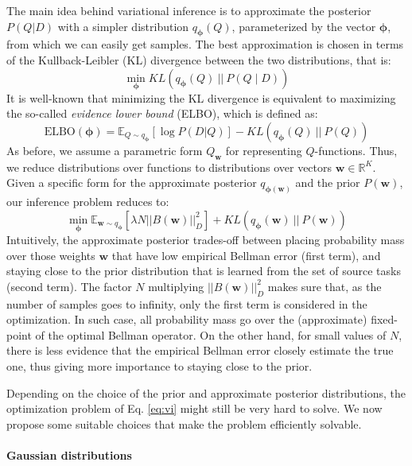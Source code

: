 \documentclass{article}
\begin{document}
The main idea behind variational inference is to approximate the posterior $P(Q | D)$ with a simpler distribution $q_{\bm{\phi}}(Q)$, parameterized by the vector $\bm{\phi}$, from which we can easily get samples. The best approximation is chosen in terms of the Kullback-Leibler (KL) divergence between the two distributions, that is:
\begin{equation}
\min_{\bm{\phi}} KL\left(q_{\bm{\phi}}(Q)\ ||\ P(Q \mid D)\right)
\end{equation}
It is well-known that minimizing the KL divergence is equivalent to maximizing the so-called \textit{evidence lower bound} (ELBO), which is defined as:
\begin{equation}
\text{ELBO}(\bm{\phi}) = \mathbb{E}_{Q \sim q_{\bm{\phi}}}\left[ \log P(D | Q) \right] - KL\left(q_{\bm{\phi}}(Q)\ ||\ P(Q)\right)
\end{equation}
As before, we assume a parametric form $Q_{\bm{w}}$ for representing $Q$-functions. Thus, we reduce distributions over functions to distributions over vectors $\bm{w} \in \mathbb{R}^K$. Given a specific form for the approximate posterior $q_{\bm{\phi}(\bm{w})}$ and the prior $P(\bm{w})$, our inference problem reduces to:
\begin{equation} \label{eq:vi}
\min_{\bm{\phi}} \mathbb{E}_{\bm{w} \sim q_{\bm{\phi}}}\left[ \lambda N ||B(\bm{w})||_{D}^2 \right] + KL\left(q_{\bm{\phi}}(\bm{w})\ ||\ P(\bm{w})\right)
\end{equation}
Intuitively, the approximate posterior trades-off between placing probability mass over those weights $\bm{w}$ that have low empirical Bellman error (first term), and staying close to the prior distribution that is learned from the set of source tasks (second term). The factor $N$ multiplying $||B(\bm{w})||_{D}^2$ makes sure that, as the number of samples goes to infinity, only the first term is considered in the optimization. In such case, all probability mass go over the (approximate) fixed-point of the optimal Bellman operator. On the other hand, for small values of $N$, there is less evidence that the empirical Bellman error closely estimate the true one, thus giving more importance to staying close to the prior.

Depending on the choice of the prior and approximate posterior distributions, the optimization problem of Eq. \eqref{eq:vi} might still be very hard to solve. We now propose some suitable choices that make the problem efficiently solvable.

\paragraph*{Gaussian distributions}
\end{document}
